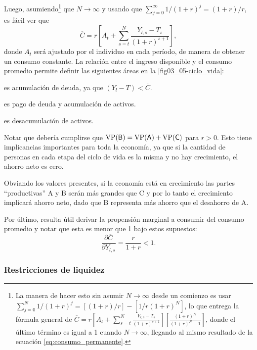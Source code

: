 \documentclass[DeGregorioResumen]{subfiles}
\begin{document}
Luego, asumiendo\footnote{La manera de hacer esto sin asumir $N\rightarrow\infty$ desde un comienzo es usar $\sum_{j=0}^{N}{1/(1+r)^j} = [(1+r)/r]-[1/r(1+r)^N]$, lo que entrega la fórmula general de $\overline{C} = r\left[A_t+\sum_{s=t}^{N}{\frac{Y_{l,s}-T_s}{(1+r)^{s+1}}}\right]\left[\frac{(1+r)^N}{(1+r)^N-1}\right]$, donde el último término es igual a 1 cuando $N\rightarrow\infty$, llegando al mismo resultado de la ecuación \eqref{eq:consumo_permanente}.} que $N\rightarrow\infty$ y usando que $\sum_{j=0}^{\infty}{1/(1+r)^j} = (1+r)/r$, es fácil ver que
\begin{equation}
\overline{C} = r\left[A_t+\sum_{s=t}^{N}{\frac{Y_{l,s}-T_s}{(1+r)^{s+1}}}\right],
\label{eq:consumo_permanente}
\end{equation}
donde $A_t$ será ajustado por el individuo en cada período, de manera de obtener un consumo constante. La relación entre el ingreso disponible y el consumo promedio permite definir las siguientes áreas en la \autoref{fig03_05-ciclo_vida}:

\begin{where}
  \item[\text{\textsf{A}}] es acumulación de deuda, ya que $(Y_l-T)<\overline{C}$.
  \item[\text{\textsf{B}}] es pago de deuda y acumulación de activos.
  \item[\text{\textsf{C}}] es desacumulación de activos.
\end{where}

Notar que debería cumplirse que $\text{VP(\textsf{B})} = \text{VP(\textsf{A})} + \text{VP(\textsf{C})}$ para $r>0$. Esto tiene implicancias importantes para toda la economía, ya que si la cantidad de personas en cada etapa del ciclo de vida es la misma y no hay crecimiento, el ahorro neto es cero.

Obviando los valores presentes, si la economía está en crecimiento las partes ``productivas'' \textsf{A} y \textsf{B} serán más grandes que \textsf{C} y por lo tanto el crecimiento implicará ahorro neto, dado que \textsf{B} representa más ahorro que el desahorro de \textsf{A}.

Por último, resulta útil derivar la propensión marginal a consumir del consumo promedio y notar que esta es menor que 1 bajo estos supuestos:
\begin{equation*}
\frac{\partial \overline{C}}{\partial Y_{l,s}}=\frac{r}{1+r} <1.
\end{equation*}

\subsubsection{Restricciones de liquidez} %
\end{document}
